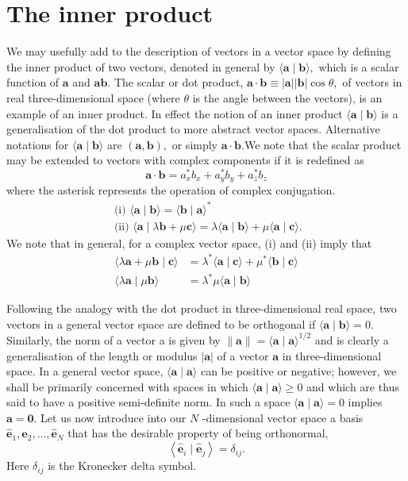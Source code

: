 \documentclass[12pt]{book}
\theoremstyle{definition}\newtheorem{dfn}{Définition}[chapter]
\theoremstyle{plain}\newtheorem{thm}{Théorème}[chapter]
\theoremstyle{plain}\newtheorem{prp}{Proposition}[chapter]
\theoremstyle{plain}\newtheorem{lem}{\bf Lemme}[chapter]
\theoremstyle{plain}\newtheorem{axm}{\bf Axiome}[chapter]
\theoremstyle{plain}\newtheorem{lmm}{\bf Lemme}[chapter]
\theoremstyle{plain}\newtheorem{cor}{\bf Corollaire}[chapter]
\theoremstyle{remark}\newtheorem{rem}{Remarque}[chapter]
\begin{document}
\section{The inner product}
We may usefully add to the description of vectors in a vector space by defining the inner product of two vectors, denoted in general by $\langle\mathbf{a} \mid \mathbf{b}\rangle,$ which is a scalar function of $\mathbf{a}$ and $\mathbf{ab}$. The scalar or dot product, $\mathbf{a} \cdot \mathbf{b} \equiv|\mathbf{a}||\mathbf{b}| \cos \theta,$ of vectors in real three-dimensional space (where $\theta$ is the angle between the vectors), is an example of an inner product. In effect the notion of an inner product $\langle\mathbf{a} \mid \mathbf{b}\rangle$ is a generalisation of the dot product to more abstract vector spaces. Alternative notations for $\langle\mathbf{a} \mid \mathbf{b}\rangle$ are $(\mathbf{a}, \mathbf{b}),$ or simply $\mathbf{a} \cdot \mathbf{b}$.We note that the scalar product may be extended to vectors with complex components if it is redefined as
$$
\mathbf{a} \cdot \mathbf{b}=a_{x}^{*} b_{x}+a_{y}^{*} b_{y}+a_{z}^{*} b_{z}
$$
where the asterisk represents the operation of complex conjugation. 
$$
\begin{array}{l}
\text { (i) }\langle\mathbf{a} \mid \mathbf{b}\rangle=\langle\mathbf{b} \mid \mathbf{a}\rangle^{*} \\
\text { (ii) }\langle\mathbf{a} \mid \lambda \mathbf{b}+\mu \mathbf{c}\rangle=\lambda\langle\mathbf{a} \mid \mathbf{b}\rangle+\mu\langle\mathbf{a} \mid \mathbf{c}\rangle .
\end{array}
$$
We note that in general, for a complex vector space,
(i) and (ii) imply that
$$
\begin{aligned}
\langle\lambda \mathbf{a}+\mu \mathbf{b} \mid \mathbf{c}\rangle &=\lambda^{*}\langle\mathbf{a} \mid \mathbf{c}\rangle+\mu^{*}\langle\mathbf{b} \mid \mathbf{c}\rangle \\
\langle\lambda \mathbf{a} \mid \mu \mathbf{b}\rangle &=\lambda^{*} \mu\langle\mathbf{a} \mid \mathbf{b}\rangle
\end{aligned}
$$

Following the analogy with the dot product in three-dimensional real space, two vectors in a general vector space are defined to be orthogonal if $\langle\mathbf{a} \mid \mathbf{b}\rangle=0$. Similarly, the norm of a vector a is given by $\|\mathbf{a}\|=\langle\mathbf{a} \mid \mathbf{a}\rangle^{1 / 2}$ and is clearly a generalisation of the length or modulus $|\mathbf{a}|$ of a vector $\mathbf{a}$ in three-dimensional space. In a general vector space,  $\langle\mathbf{a} \mid \mathbf{a}\rangle$ can be positive or negative; however, we shall be primarily concerned with spaces in which $\langle\mathbf{a} \mid \mathbf{a}\rangle \geq 0$ and which are thus said to have a positive semi-definite norm. In such a space $\langle\mathbf{a} \mid \mathbf{a}\rangle=0$ implies $\mathbf{a}=\mathbf{0}$. Let us now introduce into our $N$ -dimensional vector space a basis $\hat{\mathbf{e}}_{1}, \hat{\mathbf{e}}_{2}, \ldots, \hat{\mathbf{e}}_{N}$ that has the desirable property of being orthonormal,
$$
\left\langle\hat{\mathbf{e}}_{i} \mid \hat{\mathbf{e}}_{j}\right\rangle=\delta_{i j}.
$$
Here $\delta_{i j}$ is the Kronecker delta symbol.
\end{document}
